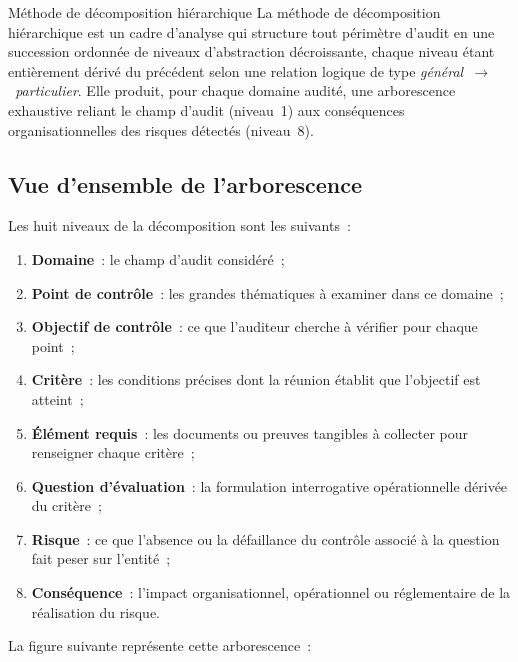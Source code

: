 \begin{boxdef}{Méthode de décomposition hiérarchique}
La méthode de décomposition hiérarchique est un cadre d'analyse qui structure
tout périmètre d'audit en une succession ordonnée de niveaux d'abstraction
décroissante, chaque niveau étant entièrement dérivé du précédent selon une
relation logique de type \emph{général~$\to$~particulier}. Elle produit, pour
chaque domaine audité, une arborescence exhaustive reliant le champ d'audit
(niveau~1) aux conséquences organisationnelles des risques détectés (niveau~8).
\end{boxdef}

\subsection{Vue d'ensemble de l'arborescence}

Les huit niveaux de la décomposition sont les suivants~:

\begin{enumerate}
  \item \textbf{Domaine}~:  le champ d'audit considéré~;
  \item \textbf{Point de contrôle}~:  les grandes thématiques à examiner dans
        ce domaine~;
  \item \textbf{Objectif de contrôle}~:  ce que l'auditeur cherche à vérifier
        pour chaque point~;
  \item \textbf{Critère}~:  les conditions précises dont la réunion établit
        que l'objectif est atteint~;
  \item \textbf{Élément requis}~:  les documents ou preuves tangibles à
        collecter pour renseigner chaque critère~;
  \item \textbf{Question d'évaluation}~:  la formulation interrogative
        opérationnelle dérivée du critère~;
  \item \textbf{Risque}~:  ce que l'absence ou la défaillance du contrôle
        associé à la question fait peser sur l'entité~;
  \item \textbf{Conséquence}~:  l'impact organisationnel, opérationnel ou
        réglementaire de la réalisation du risque.
\end{enumerate}

La figure suivante représente cette arborescence~:

